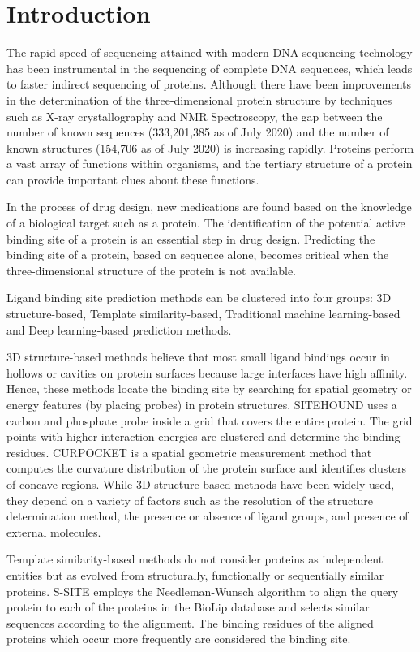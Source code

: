 \documentclass[journal=jacsat,manuscript=article]{achemso}
\begin{document}
\section{Introduction}
\quad The rapid speed of sequencing attained with modern DNA sequencing technology has been instrumental in the sequencing of complete DNA sequences, which leads to faster indirect sequencing of proteins. Although there have been improvements in the determination of the three-dimensional protein structure by techniques such as X-ray crystallography and NMR Spectroscopy, the gap between the number of known sequences (333,201,385 as of July 2020) and the number of known structures (154,706 as of July 2020) is increasing rapidly. Proteins perform a vast array of functions within organisms, and the tertiary structure of a protein can provide important clues about these functions.

In the process of drug design, new medications are found based on the knowledge of a biological target such as a protein. The identification of the potential active binding site of a protein is an essential step in drug design. Predicting the binding site of a protein, based on sequence alone, becomes critical when the three-dimensional structure of the protein is not available.

Ligand binding site prediction methods can be clustered into four groups: 3D structure-based, Template similarity-based, Traditional machine learning-based and Deep learning-based prediction methods.

3D structure-based methods believe that most small ligand bindings occur in hollows or cavities on protein surfaces because large interfaces have high affinity. Hence, these methods locate the binding site by searching for spatial geometry or energy features (by placing probes) in protein structures. SITEHOUND \cite{hernandez2009sitehound} uses a carbon and phosphate probe inside a grid that covers the entire protein. The grid points with higher interaction energies are clustered and determine the binding residues. CURPOCKET \cite{liu2020cb} is a spatial geometric measurement method that computes the curvature distribution of the protein surface and identifies clusters of concave regions. While 3D structure-based methods have been widely used, they depend on a variety of factors such as the resolution of the structure determination method, the presence or absence of ligand groups, and presence of external molecules.

\newpage
Template similarity-based methods do not consider proteins as independent entities but as evolved from structurally, functionally or sequentially similar proteins. S-SITE \cite{yang2013protein} employs the Needleman-Wunsch algorithm to align the query protein to each of the proteins in the BioLip \cite{yang2012biolip} database and selects similar sequences according to the alignment. The binding residues of the aligned proteins which occur more frequently are considered the binding site.
\end{document}
